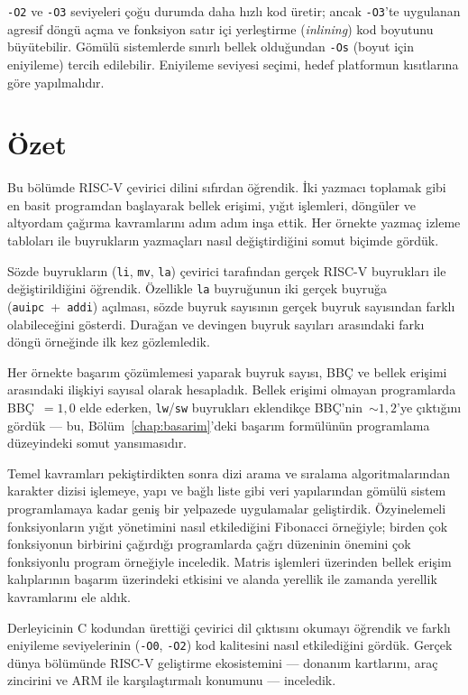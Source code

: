 \texttt{-O2} ve \texttt{-O3} seviyeleri çoğu durumda daha hızlı kod üretir; ancak \texttt{-O3}'te uygulanan agresif döngü açma ve fonksiyon satır içi yerleştirme (\emph{inlining}) kod boyutunu büyütebilir. Gömülü sistemlerde sınırlı bellek olduğundan \texttt{-Os} (boyut için eniyileme) tercih edilebilir. Eniyileme seviyesi seçimi, hedef platformun kısıtlarına göre yapılmalıdır.


\section{Özet}
\label{sec:ozet-programlama}

Bu bölümde RISC-V çevirici dilini sıfırdan öğrendik. İki yazmacı toplamak gibi en basit programdan başlayarak bellek erişimi, yığıt işlemleri, döngüler ve altyordam çağırma kavramlarını adım adım inşa ettik. Her örnekte yazmaç izleme tabloları ile buyrukların yazmaçları nasıl değiştirdiğini somut biçimde gördük.

Sözde buyrukların (\texttt{li}, \texttt{mv}, \texttt{la}) çevirici tarafından gerçek RISC-V buyrukları ile değiştirildiğini öğrendik. Özellikle \texttt{la} buyruğunun iki gerçek buyruğa (\texttt{auipc}~+~\texttt{addi}) açılması, sözde buyruk sayısının gerçek buyruk sayısından farklı olabileceğini gösterdi. Durağan ve devingen buyruk sayıları arasındaki farkı döngü örneğinde ilk kez gözlemledik.

Her örnekte başarım çözümlemesi yaparak buyruk sayısı, BBÇ ve bellek erişimi arasındaki ilişkiyi sayısal olarak hesapladık. Bellek erişimi olmayan programlarda BBÇ~$= 1{,}0$ elde ederken, \texttt{lw}/\texttt{sw} buyrukları eklendikçe BBÇ'nin~$\sim 1{,}2$'ye çıktığını gördük --- bu, Bölüm~\ref{chap:basarim}'deki başarım formülünün programlama düzeyindeki somut yansımasıdır.

Temel kavramları pekiştirdikten sonra dizi arama ve sıralama algoritmalarından karakter dizisi işlemeye, yapı ve bağlı liste gibi veri yapılarından gömülü sistem programlamaya kadar geniş bir yelpazede uygulamalar geliştirdik. Özyinelemeli fonksiyonların yığıt yönetimini nasıl etkilediğini Fibonacci örneğiyle; birden çok fonksiyonun birbirini çağırdığı programlarda çağrı düzeninin önemini çok fonksiyonlu program örneğiyle inceledik. Matris işlemleri üzerinden bellek erişim kalıplarının başarım üzerindeki etkisini ve alanda yerellik ile zamanda yerellik kavramlarını ele aldık.

Derleyicinin C kodundan ürettiği çevirici dil çıktısını okumayı öğrendik ve farklı eniyileme seviyelerinin (\texttt{-O0}, \texttt{-O2}) kod kalitesini nasıl etkilediğini gördük. Gerçek dünya bölümünde RISC-V geliştirme ekosistemini --- donanım kartlarını, araç zincirini ve ARM ile karşılaştırmalı konumunu --- inceledik.

